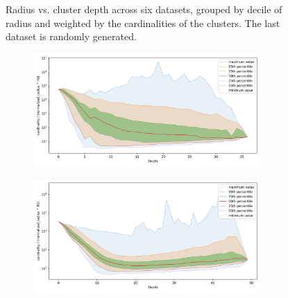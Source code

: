 \documentclass{article}
\begin{document}
\begin{figure}[ht!]
\begin{subfigure}[b]{0.47\textwidth}
    \label{fig:results:random-radius}
    \end{subfigure}
    \vspace{1em}
    \caption{Radius vs. cluster depth across six datasets, grouped by decile of radius and weighted by the cardinalities of the clusters.
    The last dataset is randomly generated.}
    \label{fig:results:radius-plots}
\end{figure}

\begin{figure}[ht!]
    \begin{subfigure}[b]{0.47\textwidth}
    \includegraphics[width=0.95\textwidth]{images/fractal_density/fashion-mnist-60000.png}\\
    \label{fig:results:fashion-mnist-fractal_density}
    \end{subfigure}%
    \begin{subfigure}[b]{0.47\textwidth}
    \includegraphics[width=0.95\textwidth]{images/fractal_density/glove-25-1183514.png}\\
    \label{fig:results:glove-25-fractal_density}
    \end{subfigure}
    \vspace{1em}
    \\

\end{figure}
\end{document}
